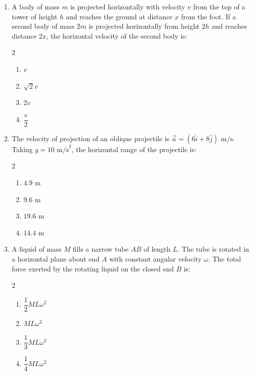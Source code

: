 \documentclass[11pt,a4paper]{article}
\begin{document}
\begin{enumerate}[label=\textbf{\textcolor{l1Green}{Q\arabic*.}},leftmargin=24pt,itemsep=10pt]
  \item A body of mass $m$ is projected horizontally with velocity $v$ from the top of a tower of height $h$ and reaches the ground at distance $x$ from the foot. If a second body of mass $2m$ is projected horizontally from height $2h$ and reaches distance $2x$, the horizontal velocity of the second body is:
  \begin{multicols}{2}
  \begin{enumerate}[label=\textbf{\textcolor{primaryDark}{(\Alph*)}},itemsep=2pt]
    \item $v$
    \item $\sqrt{2}v$
    \item $2v$
    \item $\dfrac{v}{2}$
  \end{enumerate}
  \end{multicols}

  \item The velocity of projection of an oblique projectile is $\vec{u} = (6\hat{i} + 8\hat{j})\text{ m/s}$. Taking $g = 10\text{ m/s}^2$, the horizontal range of the projectile is:
  \begin{multicols}{2}
  \begin{enumerate}[label=\textbf{\textcolor{primaryDark}{(\Alph*)}},itemsep=2pt]
    \item $4.9\text{ m}$
    \item $9.6\text{ m}$
    \item $19.6\text{ m}$
    \item $14.4\text{ m}$
  \end{enumerate}
  \end{multicols}

  \item A liquid of mass $M$ fills a narrow tube $AB$ of length $L$. The tube is rotated in a horizontal plane about end $A$ with constant angular velocity $\omega$. The total force exerted by the rotating liquid on the closed end $B$ is:
  \begin{multicols}{2}
  \begin{enumerate}[label=\textbf{\textcolor{primaryDark}{(\Alph*)}},itemsep=2pt]
    \item $\dfrac{1}{2}ML\omega^2$
    \item $ML\omega^2$
    \item $\dfrac{1}{3}ML\omega^2$
    \item $\dfrac{1}{4}ML\omega^2$
  \end{enumerate}
  \end{multicols}


\end{enumerate}
\end{document}
